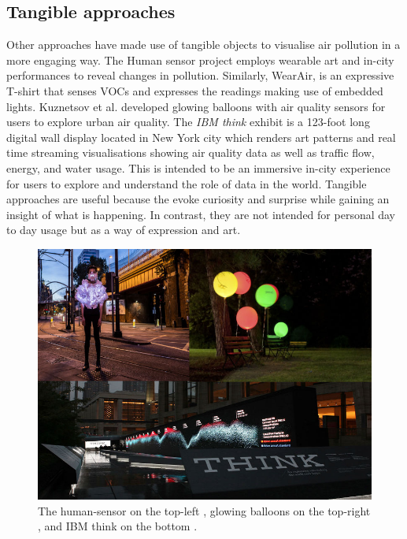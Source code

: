\subsection{Tangible approaches}
Other approaches have made use of tangible objects to visualise air pollution in a more engaging way. The Human sensor project \cite{InvisibleDust2016} employs wearable art and in-city performances to reveal changes in pollution. Similarly, WearAir, \cite{Kim2010} is an expressive T-shirt that senses VOCs and expresses the readings making use of embedded lights. Kuznetsov et al. \cite{Kuznetsov2011} developed glowing balloons with air quality sensors for users to explore urban air quality. The \textit{IBM think} exhibit \cite{IBM2012} is a 123-foot long digital wall display located in New York city which renders art patterns and real time streaming visualisations showing air quality data as well as traffic flow, energy, and water usage. This is intended to be an immersive in-city experience for users to explore and understand the role of data in the world. Tangible approaches are useful because the evoke curiosity and surprise while gaining an insight of what is happening. In contrast, they are not intended for personal day to day usage but as a way of expression and art. 

\begin{figure}[H]
\begin{adjustbox}{width=.8\textwidth,center=\textwidth}
  \centering
  \includegraphics[scale=.4]{images/think_human_sensor_balloons.jpg}
\end{adjustbox}
  \caption[Tangible visualizations]{The human-sensor on the top-left \cite{InvisibleDust2016}, glowing balloons on the top-right \cite{Kuznetsov2011}, and IBM think on the bottom \cite{IBM2012}.}
  \label{fig:photo_based_instaNO2}
\end{figure}

